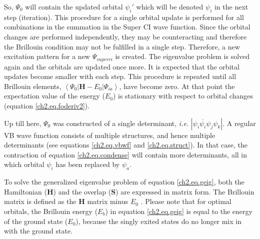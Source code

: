 So, $\Psi_0$ will contain the updated orbital $\psi_i'$ which will be denoted $\psi_i$ in the next step (iteration). This procedure for a single orbital update is performed for all combinations in the summation in the Super CI wave function. Since the orbital changes are performed independently, they may be counteracting and therefore the Brillouin condition may not be fulfilled in a single step. Therefore, a new excitation pattern for a new $\Psi_{superci}$ is created. The eigenvalue problem is solved again and the orbitals are updated once more. It is expected that the orbital updates become smaller with each step. This procedure is repeated until all Brillouin elements, $\left < \Psi_0 | \mathbf{H} - E_0 | \Psi_{ia} \right >$, have become zero. At that point the expectation value of the energy ($E_0$) is stationary with respect to orbital changes (equation \ref{ch2.eq.foderiv2}).

Up till here, $\Psi_0$ was constructed of a single determinant, \textit{i.e.} $|\psi_i\overline{\psi_i}\psi_j\psi_k|$. A regular VB wave function consists of multiple structures, and hence multiple determinants (see equations \ref{ch2.eq.vbwf} and \ref{ch2.eq.struct}). In that case, the contraction of equation \ref{ch2.eq.condense} will contain more determinants, all in which orbital $\psi_i$ has been replaced by $\psi_a$.

To solve the generalized eigenvalue problem of equation \ref{ch2.eq.geig}, both the Hamiltonian ($\mathbf{H}$) and the overlap ($\mathbf{S}$) are expressed in matrix form.  The Brillouin matrix is defined as the $\mathbf{H}$ matrix minus $E_0$ \cite{koos1}. Please note that for optimal orbitals, the Brillouin energy ($E_b$) in equation \ref{ch2.eq.geig} is equal to the energy of the ground state ($E_0$), because the singly exited states do no longer mix in with the ground state. 

